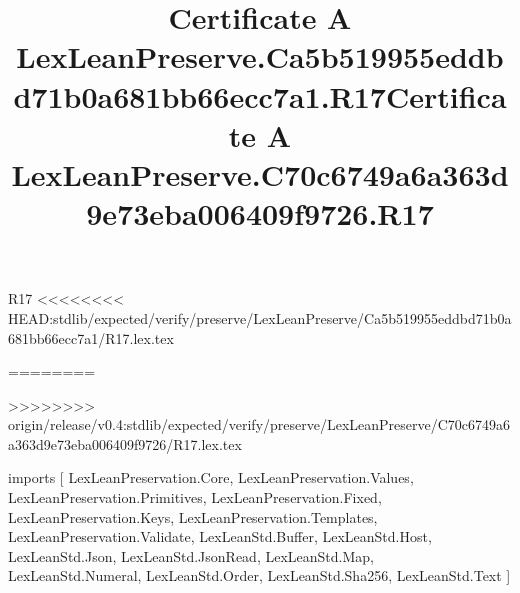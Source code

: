 \begin{lexlean}{R17}
<<<<<<<< HEAD:stdlib/expected/verify/preserve/LexLeanPreserve/Ca5b519955eddbd71b0a681bb66ecc7a1/R17.lex.tex
\title{Certificate A LexLeanPreserve.Ca5b519955eddbd71b0a681bb66ecc7a1.R17}
========
\title{Certificate A LexLeanPreserve.C70c6749a6a363d9e73eba006409f9726.R17}
>>>>>>>> origin/release/v0.4:stdlib/expected/verify/preserve/LexLeanPreserve/C70c6749a6a363d9e73eba006409f9726/R17.lex.tex
\begin{coremodule}
imports [
  LexLeanPreservation.Core,
  LexLeanPreservation.Values,
  LexLeanPreservation.Primitives,
  LexLeanPreservation.Fixed,
  LexLeanPreservation.Keys,
  LexLeanPreservation.Templates,
  LexLeanPreservation.Validate,
  LexLeanStd.Buffer,
  LexLeanStd.Host,
  LexLeanStd.Json,
  LexLeanStd.JsonRead,
  LexLeanStd.Map,
  LexLeanStd.Numeral,
  LexLeanStd.Order,
  LexLeanStd.Sha256,
  LexLeanStd.Text
]


\end{coremodule}
\end{lexlean}
